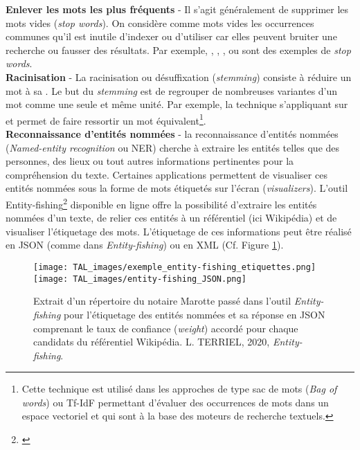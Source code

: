 \textbf{Enlever les mots les plus fréquents} - Il s'agit généralement de supprimer les mots vides (\textit{stop words}). On considère comme mots vides les occurrences communes qu'il est inutile d'indexer ou d'utiliser car elles peuvent bruiter une recherche ou fausser des résultats. Par exemple, , , , ou  sont des exemples de \textit{stop words}.\\

\textbf{Racinisation} - La racinisation ou désuffixation (\textit{stemming}) consiste à réduire un mot à sa . Le but du \textit{stemming} est de regrouper de nombreuses variantes d’un mot comme une seule et même unité. Par exemple, la technique s'appliquant sur  et  permet de faire ressortir un mot équivalent\footnote{Cette technique est utilisé dans les approches de type sac de mots (\textit{Bag of words}) ou Tf-IdF permettant d'évaluer des occurrences de mots dans un espace vectoriel et qui sont à la base des moteurs de recherche textuels.}.\\

\textbf{Reconnaissance d'entités nommées} - la reconnaissance d'entités nommées (\textit{Named-entity recognition} ou NER) cherche à extraire les entités telles que des personnes, des lieux ou tout autres informations pertinentes pour la compréhension du texte. Certaines applications permettent de visualiser ces entités nommées sous la forme de mots étiquetés sur l'écran (\textit{visualizers}). L'outil Entity-fishing\footnote{\cite{lopez_entity-fishing_nodate}} disponible en ligne offre la possibilité d'extraire les entités nommées d'un texte, de relier ces entités à un référentiel (ici Wikipédia) et de visualiser l'étiquetage des mots. L'étiquetage de ces informations peut être réalisé en JSON (comme dans \textit{Entity-fishing}) ou en XML (Cf. Figure \ref{fig:NER}).

\begin{figure}
    \centering
    \texttt{[image: TAL\_images/exemple\_entity-fishing\_etiquettes.png]}
    \texttt{[image: TAL\_images/entity-fishing\_JSON.png]}
    \caption{Extrait d'un répertoire du notaire Marotte passé dans l'outil \textit{Entity-fishing} pour l'étiquetage des entités nommées et sa réponse en JSON comprenant le taux de confiance (\textit{weight}) accordé pour chaque candidats du référentiel Wikipédia.  \textcopyright L. TERRIEL, 2020, \textit{Entity-fishing}.}
    \label{fig:NER}
\end{figure}

